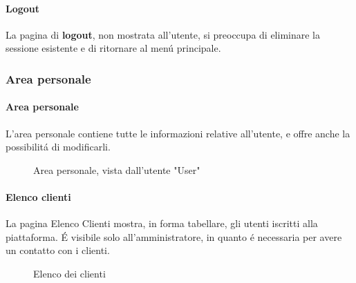 \documentclass{article}
\begin{document}
\paragraph*{Logout}
La pagina di \textbf{logout}, non mostrata all'utente, si preoccupa di eliminare la sessione esistente e di ritornare al menú principale.


\subsubsection{Area personale}
\paragraph*{Area personale}
L'area personale contiene tutte le informazioni relative all'utente, e offre anche la possibilitá di modificarli.
\begin{figure}[H]
	\centering
	\caption{Area personale, vista dall'utente "User"}
\end{figure}
\paragraph*{Elenco clienti}
La pagina Elenco Clienti mostra, in forma tabellare, gli utenti iscritti alla piattaforma. É visibile solo all'amministratore, in quanto é necessaria per avere un contatto con i clienti.
\begin{figure}[H]
	\centering
	\caption{Elenco dei clienti}
\end{figure}
\end{document}
